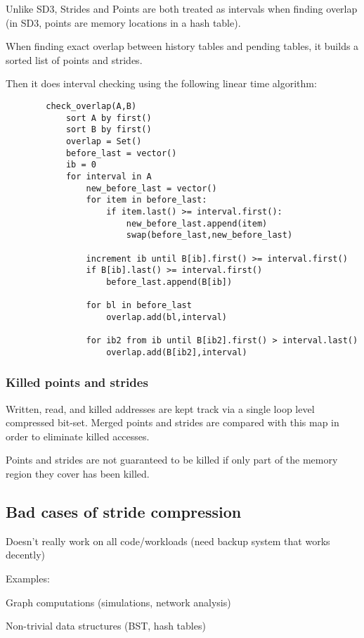 \documentclass[12pt,twoside]{reedthesis}
\begin{document}
		Unlike SD3, Strides and Points are both treated as intervals when finding overlap (in SD3, points are memory locations in a hash table).

		When finding exact overlap between history tables and pending tables, it builds a sorted list of points and strides.

		Then it does interval checking using the following linear time algorithm:

		\begin{verbatim}
		check_overlap(A,B)
		    sort A by first()
		    sort B by first()
		    overlap = Set()
		    before_last = vector()
		    ib = 0
		    for interval in A
		        new_before_last = vector()
		        for item in before_last:
		            if item.last() >= interval.first():
		                new_before_last.append(item)
		                swap(before_last,new_before_last)

		        increment ib until B[ib].first() >= interval.first()
		        if B[ib].last() >= interval.first()
		            before_last.append(B[ib])

		        for bl in before_last
		            overlap.add(bl,interval)

		        for ib2 from ib until B[ib2].first() > interval.last()
		            overlap.add(B[ib2],interval)
		\end{verbatim}

		\subsubsection{Killed points and strides}

		Written, read, and killed addresses are kept track via a single loop level compressed bit-set. Merged points and strides are compared with this map in order to eliminate killed accesses.

		Points and strides are not guaranteed to be killed if only part of the memory region they cover has been killed.

		\subsection{Bad cases of stride compression}

		Doesn’t really work on all code/workloads (need backup system that works decently)

		Examples:

		Graph computations (simulations, network analysis)

		Non-trivial data structures (BST, hash tables)
\end{document}
